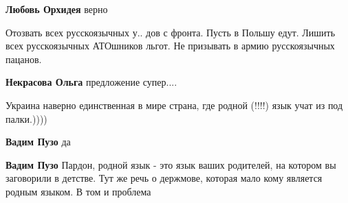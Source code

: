 \begin{itemize}
\begin{itemize}
 
\textbf{Любовь Орхидея} верно
\end{itemize}

 

Отозвать всех русскоязычных у.. дов с фронта. Пусть в Польшу едут. Лишить всех
русскоязычных АТОшников льгот. Не призывать в армию русскоязычных пацанов.

\begin{itemize}
 
\textbf{Некрасова Ольга} предложение супер....
\end{itemize}

 
Украина наверно единственная в мире страна, где родной (!!!!) язык учат из под
палки.))))

\begin{itemize}
 
\textbf{Вадим Пузо} да

 
\textbf{Вадим Пузо} Пардон, родной язык - это язык ваших родителей, на котором вы заговорили в детстве.
Тут же речь о держмове, которая мало кому является родным языком. В том и проблема


\end{itemize}
\end{itemize}

